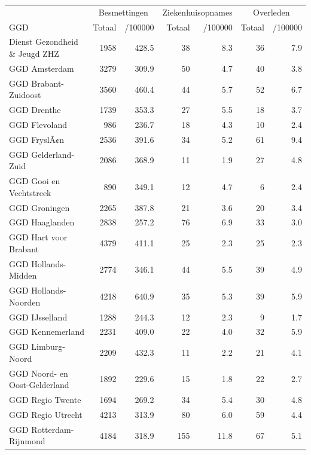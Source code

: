 \documentclass[
  english,
  man,floatsintext]{apa6}
\begin{document}
\begin{table}
\centering\begingroup\fontsize{10}{12}\selectfont

\begin{threeparttable}
\begin{tabular}{lrrrrrr}
\toprule
\multicolumn{1}{c}{ } & \multicolumn{2}{c}{Besmettingen} & \multicolumn{2}{c}{Ziekenhuisopnames} & \multicolumn{2}{c}{Overleden} \\
\cmidrule(l{3pt}r{3pt}){2-3} \cmidrule(l{3pt}r{3pt}){4-5} \cmidrule(l{3pt}r{3pt}){6-7}
GGD & Totaal & /100000 & Totaal & /100000 & Totaal & /100000\\
\midrule
Dienst Gezondheid \& Jeugd ZHZ & 1958 & 428.5 & 38 & 8.3 & 36 & 7.9\\
GGD Amsterdam & 3279 & 309.9 & 50 & 4.7 & 40 & 3.8\\
GGD Brabant-Zuidoost & 3560 & 460.4 & 44 & 5.7 & 52 & 6.7\\
GGD Drenthe & 1739 & 353.3 & 27 & 5.5 & 18 & 3.7\\
GGD Flevoland & 986 & 236.7 & 18 & 4.3 & 10 & 2.4\\
GGD FryslÃ¢n & 2536 & 391.6 & 34 & 5.2 & 61 & 9.4\\
GGD Gelderland-Zuid & 2086 & 368.9 & 11 & 1.9 & 27 & 4.8\\
GGD Gooi en Vechtstreek & 890 & 349.1 & 12 & 4.7 & 6 & 2.4\\
GGD Groningen & 2265 & 387.8 & 21 & 3.6 & 20 & 3.4\\
GGD Haaglanden & 2838 & 257.2 & 76 & 6.9 & 33 & 3.0\\
GGD Hart voor Brabant & 4379 & 411.1 & 25 & 2.3 & 25 & 2.3\\
GGD Hollands-Midden & 2774 & 346.1 & 44 & 5.5 & 39 & 4.9\\
GGD Hollands-Noorden & 4218 & 640.9 & 35 & 5.3 & 39 & 5.9\\
GGD IJsselland & 1288 & 244.3 & 12 & 2.3 & 9 & 1.7\\
GGD Kennemerland & 2231 & 409.0 & 22 & 4.0 & 32 & 5.9\\
GGD Limburg-Noord & 2209 & 432.3 & 11 & 2.2 & 21 & 4.1\\
GGD Noord- en Oost-Gelderland & 1892 & 229.6 & 15 & 1.8 & 22 & 2.7\\
GGD Regio Twente & 1694 & 269.2 & 34 & 5.4 & 30 & 4.8\\
GGD Regio Utrecht & 4213 & 313.9 & 80 & 6.0 & 59 & 4.4\\
GGD Rotterdam-Rijnmond & 4184 & 318.9 & 155 & 11.8 & 67 & 5.1\\

\end{tabular}
\end{threeparttable}
\end{table}
\end{document}
